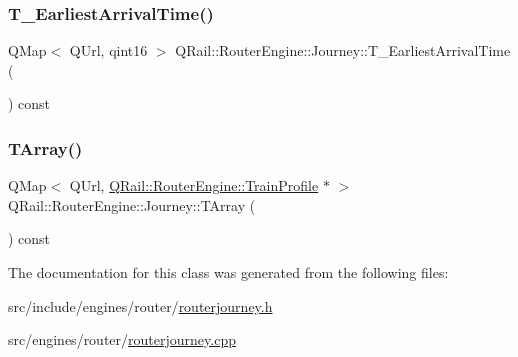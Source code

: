 \mbox{\label{classQRail_1_1RouterEngine_1_1Journey_a2c6e80f1152cc373c95361db4fe295e4}} 
\subsubsection{\texorpdfstring{T\_EarliestArrivalTime()}{T\_EarliestArrivalTime()}}
{\footnotesize\ttfamily Q\+Map$<$ Q\+Url, qint16 $>$ Q\+Rail\+::\+Router\+Engine\+::\+Journey\+::\+T\+\_\+\+Earliest\+Arrival\+Time (\begin{DoxyParamCaption}{ }\end{DoxyParamCaption}) const}

\mbox{\label{classQRail_1_1RouterEngine_1_1Journey_ab35795d36beaf773a9946c2b217ecca1}} 
\subsubsection{\texorpdfstring{TArray()}{TArray()}}
{\footnotesize\ttfamily Q\+Map$<$ Q\+Url, \mbox{\hyperlink{classQRail_1_1RouterEngine_1_1TrainProfile}{Q\+Rail\+::\+Router\+Engine\+::\+Train\+Profile}} $\ast$ $>$ Q\+Rail\+::\+Router\+Engine\+::\+Journey\+::\+T\+Array (\begin{DoxyParamCaption}{ }\end{DoxyParamCaption}) const}



The documentation for this class was generated from the following files\+:\begin{DoxyCompactItemize}
\item 
src/include/engines/router/\mbox{\hyperlink{routerjourney_8h}{routerjourney.\+h}}\item 
src/engines/router/\mbox{\hyperlink{routerjourney_8cpp}{routerjourney.\+cpp}}\end{DoxyCompactItemize}
